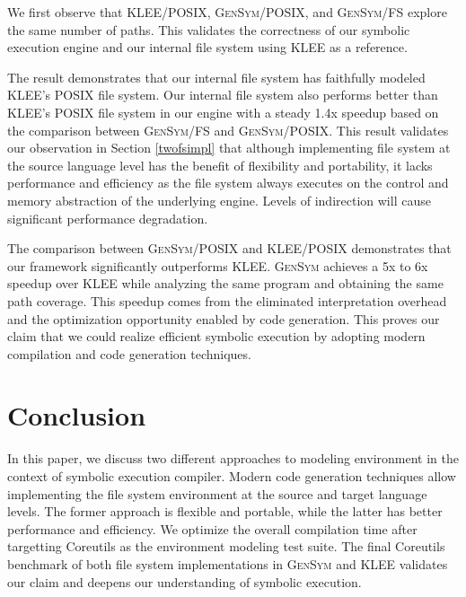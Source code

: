 \documentclass[sigplan, nonacm]{acmart}\settopmatter{printfolios=true,printccs=false,printacmref=false}
\newcommand{\tool}{\textsc{GenSym}\xspace}
\begin{document}
We first observe that KLEE/POSIX, \tool/POSIX, and \tool/FS explore the same number of paths. This validates the correctness of our symbolic execution engine and our internal file system using KLEE as a reference. \par
The result demonstrates that our internal file system has faithfully modeled KLEE's POSIX file system. Our internal file system also performs better than KLEE's POSIX file system in our engine with a steady 1.4x speedup based on the comparison between \tool/FS and \tool/POSIX. This result validates our observation in Section \ref{twofsimpl} that although implementing file system at the source language level has the benefit of flexibility and portability, it lacks performance and efficiency as the file system always executes on the control and memory abstraction of the underlying engine. Levels of indirection will cause significant performance degradation.\par
The comparison between \tool/POSIX and KLEE/POSIX demonstrates that our framework significantly outperforms KLEE. \tool achieves a 5x to 6x speedup over KLEE while analyzing the same program and obtaining the same path coverage. This speedup comes from the eliminated interpretation overhead and the optimization opportunity enabled by code generation. This proves our claim that we could realize efficient symbolic execution by adopting modern compilation and code generation techniques.
\section{Conclusion}\label{conclusion}
In this paper, we discuss two different approaches to modeling environment in the context of symbolic execution compiler. Modern code generation techniques allow implementing the file system environment at the source and target language levels. The former approach is flexible and portable, while the latter has better performance and efficiency. We optimize the overall compilation time after targetting Coreutils as the environment modeling test suite. The final Coreutils benchmark of both file system implementations in \tool and KLEE validates our claim and deepens our understanding of symbolic execution.


\end{document}
